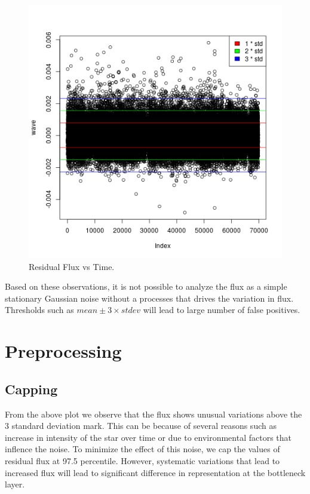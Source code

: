 \documentclass[%
aip,
amsmath,amssymb,
reprint,%
]{revtex4-1}
\begin{document}
\begin{figure}[h!]
	\includegraphics[width=\linewidth]{example.png}
	\caption{Residual Flux vs Time.}
	\label{fig:res_flux}
\end{figure}

Based on these observations, it is not possible to analyze the flux as a simple stationary Gaussian noise without a processes that drives the variation in flux. Thresholds such as $mean \pm 3 \times stdev$ will lead to large number of false positives.

\section{Preprocessing}

\subsection{Capping}

From the above plot we observe that the flux shows unusual variations above the 3 standard deviation mark. This can be because of several reasons such as increase in intensity of the star over time or due to environmental factors that inflence the noise. To minimize the effect of this noise, we cap the values of residual flux at 97.5 percentile. However, systematic variations that lead to increased flux will lead to significant difference in representation at the bottleneck layer.
\end{document}
